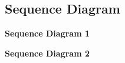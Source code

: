 \subsection{Sequence Diagram}

\bigskip
\begin{center}
	\textbf{Sequence Diagram 1}
\end{center}
\bigskip

\begin{figure}[h]
	
\end{figure}

\newpage

\bigskip
\begin{center}
	\textbf{Sequence Diagram 2}
\end{center}
\bigskip

\begin{figure}[h]
	
\end{figure}


